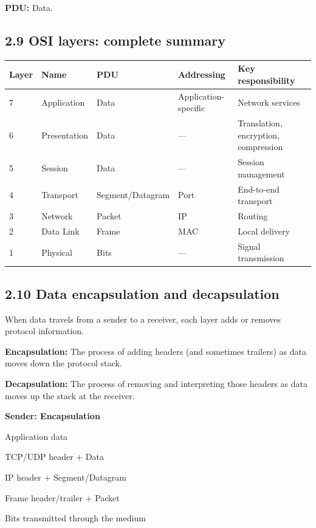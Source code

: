 \textbf{PDU:} Data.

\subsection{2.9 OSI layers: complete summary}

\begin{table}[htbp]
\centering
\begin{tabularx}{\textwidth}{p{1.2cm} p{2.5cm} p{2.8cm} p{2.2cm} X}
\toprule
\textbf{Layer} & \textbf{Name} & \textbf{PDU} & \textbf{Addressing} & \textbf{Key responsibility} \\
\midrule
7 & Application & Data & Application-specific & Network services \\
6 & Presentation & Data & — & Translation, encryption, compression \\
5 & Session & Data & — & Session management \\
4 & Transport & Segment/Datagram & Port & End-to-end transport \\
3 & Network & Packet & IP & Routing \\
2 & Data Link & Frame & MAC & Local delivery \\
1 & Physical & Bits & — & Signal transmission \\
\bottomrule
\end{tabularx}
\end{table}

\subsection{2.10 Data encapsulation and decapsulation}

When data travels from a sender to a receiver, each layer adds or removes protocol information.

\textbf{Encapsulation:} The process of adding headers (and sometimes trailers) as data moves down the protocol stack.

\textbf{Decapsulation:} The process of removing and interpreting those headers as data moves up the stack at the receiver.

\textbf{Sender: Encapsulation}

Application data

TCP/UDP header + Data

IP header + Segment/Datagram

Frame header/trailer + Packet

Bits transmitted through the medium

